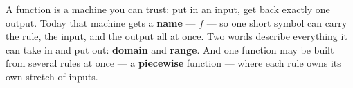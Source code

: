 \documentclass[10pt]{article}
\begin{document}
\vspace{0.14in}

\begin{remindbox}
\small
A function is a machine you can trust: put in an input, get back exactly one
output. Today that machine gets a \textbf{name} --- $f$ --- so one short symbol
can carry the rule, the input, and the output all at once. Two words describe
everything it can take in and put out: \textbf{domain} and \textbf{range}. And
one function may be built from several rules at once --- a \textbf{piecewise}
function --- where each rule owns its own stretch of inputs.
\end{remindbox}
\end{document}
